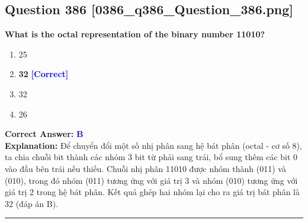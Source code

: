 \documentclass[11pt,a4paper]{article}
\begin{document}
\begin{minipage}{\textwidth}
\subsection*{Question 386 \quad \footnotesize{[0386\_q386\_Question\_386.png]}}
\noindent \textbf{What is the octal representation of the binary number 11010?}

\begin{enumerate}[label=\Alph*.]
    \item 25
    \item \textbf{32} \hfill \textcolor{blue}{\textbf{[Correct]}}
    \item 32
    \item 26
\end{enumerate}

\noindent \textbf{Correct Answer:} \textcolor{blue}{\textbf{B}} \\[2pt]
\noindent \textbf{Explanation:} Để chuyển đổi một số nhị phân sang hệ bát phân (octal - cơ số 8), ta chia chuỗi bit thành các nhóm 3 bit từ phải sang trái, bổ sung thêm các bit 0 vào đầu bên trái nếu thiếu. Chuỗi nhị phân 11010 được nhóm thành (011) và (010), trong đó nhóm (011) tương ứng với giá trị 3 và nhóm (010) tương ứng với giá trị 2 trong hệ bát phân. Kết quả ghép hai nhóm lại cho ra giá trị bát phân là 32 (đáp án B).

\par\vspace{0.3cm}
\hrule
\vspace{0.3cm}
\end{minipage}
\end{document}
